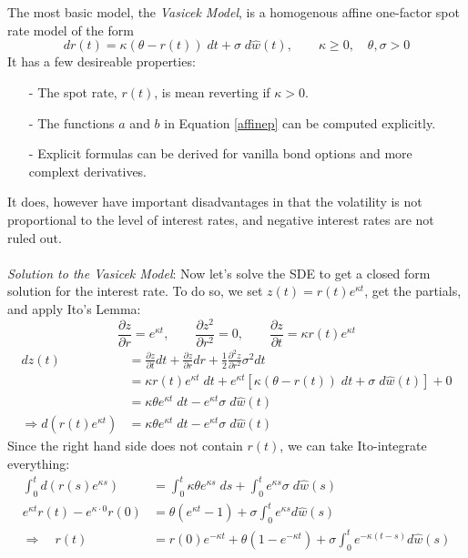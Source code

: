 \documentclass[a4paper,12pt]{scrartcl}
\begin{document}
The most basic model, the {\sl Vasicek Model}, is a homogenous affine
one-factor spot rate model of the form
\begin{equation}
   dr(t) = \kappa(\theta-r(t)) \; dt + \sigma \; d\hat{w}(t),
   \qquad \kappa \geq0, \quad \theta, \sigma > 0
\end{equation}
It has a few desireable properties:
\begin{itemize}
   \item[-] The spot rate, $r(t)$, is mean reverting if $\kappa >0$.
   \item[-] The functions $a$ and $b$ in Equation \ref{affinep}
      can be computed explicitly.
   \item[-] Explicit formulas can be derived for vanilla bond
      options and more complext derivatives.
\end{itemize}
It does, however have important disadvantages in that the volatility
is not proportional to the level of interest rates, and negative
interest rates are not ruled out. 
\\
\\
{\sl Solution to the Vasicek Model}: Now let's solve the SDE to get
a closed form solution for the interest rate. To do so, we set $z(t) =
r(t) e^{\kappa t}$, get the partials, and apply Ito's Lemma:
\[ \frac{\partial z}{\partial r} = e^{\kappa t}, \qquad  
   \frac{\partial z^2}{\partial r^2} = 0, \qquad
   \frac{\partial z}{\partial t} = \kappa r(t) e^{\kappa t} \]
\begin{align*}
   dz(t) &= \frac{\partial z}{\partial t} dt + 
   \frac{\partial z}{\partial r} dr + \frac{1}{2} 
   \frac{\partial^2 z}{\partial r^2} \sigma^2 dt\\
   &= \kappa r(t) e^{\kappa t} \; dt + e^{\kappa t} \left[
      \kappa \left( \theta - r(t)  \right) \; dt + \sigma\; d\hat{w}(t)
      \right] + 0 \\
   &= \kappa \theta e^{\kappa t} \; dt - e^{\kappa t} \sigma \; 
      d\hat{w}(t) \\
\Rightarrow d\left( r(t) e^{\kappa t}\right) &= 
   \kappa \theta e^{\kappa t} \; dt - e^{\kappa t} \sigma \; 
      d\hat{w}(t) 
\end{align*}
Since the right hand side does not contain $r(t)$, we can take 
Ito-integrate everything:
\begin{align*}
\int^t_0 d\left( r(s) e^{\kappa s}\right) &= \int^t_0
   \kappa \theta e^{\kappa s} \; ds + \int^t_0 e^{\kappa s} \sigma \; 
      d\hat{w}(s) \\
e^{\kappa t} r(t) - e^{\kappa \cdot 0} r(0) &= \theta( e^{\kappa t}-1) 
   +\sigma \int^t_0 e^{\kappa s} d\hat{w}(s)  \\
\Rightarrow \quad  r(t) &= r(0) e^{-\kappa t} + \theta(1-
   e^{-\kappa t}) +\sigma \int^t_0 e^{-\kappa (t-s)} d\hat{w}(s)  
\end{align*}
\end{document}
